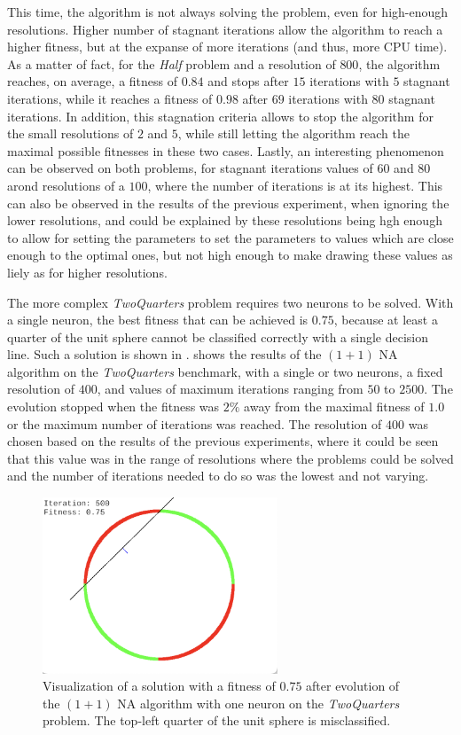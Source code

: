 This time, the algorithm is not always solving the problem, even for high-enough resolutions. Higher number of stagnant iterations allow the algorithm to reach a higher fitness, but at the
expanse of more iterations (and thus, more CPU time). As a matter of fact, for the \textit{Half} problem and a resolution of $800$, the algorithm reaches, on average, a fitness of
$0.84$ and stops after $15$ iterations with $5$ stagnant iterations, while it reaches a fitness of $0.98$ after $69$ iterations with $80$ stagnant iterations.
In addition, this stagnation criteria allows to stop the algorithm for the small resolutions of $2$ and $5$, while still letting the algorithm reach the maximal possible fitnesses in these
two cases. Lastly, an interesting phenomenon can be observed on both problems, for stagnant iterations values of $60$ and $80$ arond resolutions of a $100$, where the number of iterations
is at its highest. This can also be observed in the results of the previous experiment, when ignoring the lower resolutions, and could be explained by these resolutions being hgh enough
to allow for setting the parameters to set the parameters to values which are close enough to the optimal ones, but not high enough to make drawing these values as liely as for higher resolutions.

The more complex \textit{TwoQuarters} problem requires two neurons to be solved. With a single neuron, the best fitness that can be achieved is $0.75$, because at least a quarter of the unit sphere
cannot be classified correctly with a single decision line. Such a solution is shown in .
 shows the results of the $(1 + 1)$ NA algorithm on the \textit{TwoQuarters} benchmark, with a single or two neurons,
a fixed resolution of $400$, and values of maximum iterations ranging from $50$ to $2500$. The evolution stopped when the fitness was $2\%$ away from the maximal fitness of $1.0$ or
the maximum number of iterations was reached. The resolution of $400$ was chosen based on the results of the previous experiments, where it could be seen that this value was in the range of
resolutions where the problems could be solved and the number of iterations needed to do so was the lowest and not varying.

\begin{figure}
    \centering
    \includegraphics[width=7cm]{Pictures/twoquarters-single}
    \caption{Visualization of a solution with a fitness of $0.75$ after evolution of the $(1 + 1)$ NA algorithm with one neuron on the \textit{TwoQuarters} problem.
    The top-left quarter of the unit sphere is misclassified.}
    \label{fig:na_twoquarters_single_visual}
\end{figure}

